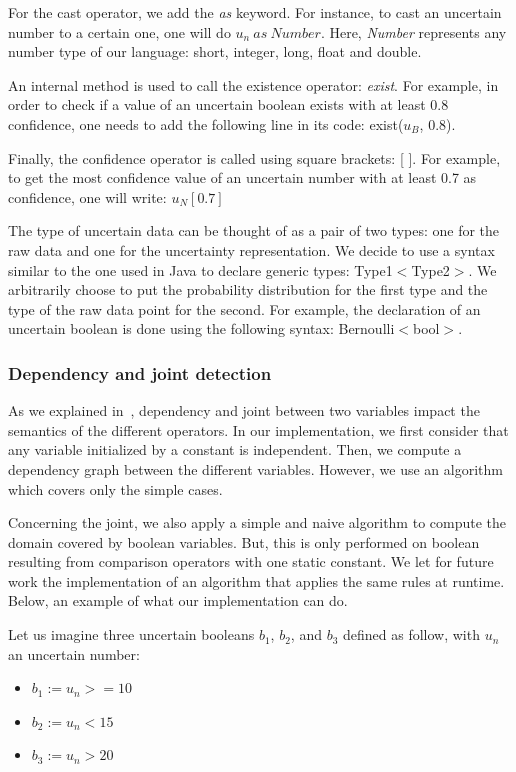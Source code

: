 For the cast operator, we add the \textit{as} keyword.
For instance, to cast an uncertain number to a certain one, one will do $u_n\ as\ Number$.
Here, \textit{Number} represents any number type of our language: short, integer, long, float and double.

An internal method is used to call the existence operator: \textit{exist}.
For example, in order to check if a value of an uncertain boolean exists with at least 0.8 confidence, one needs to add the following line in its code: exist($u_B$, 0.8).

Finally, the confidence operator is called using square brackets: [ ].
For example, to get the most confidence value of an uncertain number with at least 0.7 as confidence, one will write: $u_N[0.7]$

\bigskip
The type of uncertain data can be thought of as a pair of two types: one for the raw data and one for the uncertainty representation.
We decide to use a syntax similar to the one used in Java to declare generic types: Type1$<$Type2$>$.
We arbitrarily choose to put the probability distribution for the first type and the type of the raw data point for the second.
For example, the declaration of an uncertain boolean is done using the following syntax: Bernoulli$<$bool$>$.

\subsubsection{Dependency and joint detection}
As we explained in~, dependency and joint between two variables impact the semantics of the different operators.
In our implementation, we first consider that any variable initialized by a constant is independent.
Then, we compute a dependency graph between the different variables.
However, we use an algorithm which covers only the simple cases.

Concerning the joint, we also apply a simple and naive algorithm to compute the domain covered by boolean variables.
But, this is only performed on boolean resulting from comparison operators with one static constant.
We let for future work the implementation of an algorithm that applies the same rules at runtime.
Below, an example of what our implementation can do.

Let us imagine three uncertain booleans $b_1$, $b_2$, and $b_3$ defined as follow, with $u_n$ an uncertain number: 
\begin{itemize}
	\item $b_1 := u_n >= 10$
	\item $b_2 := u_n < 15$
	\item $b_3 := u_n > 20$
\end{itemize}


